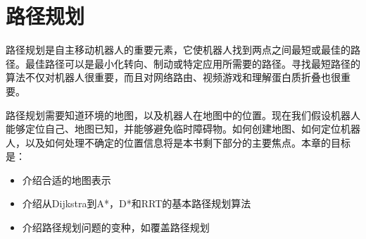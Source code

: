 \chapter{路径规划}
\label{chap:pathplanning}

路径规划是自主移动机器人的重要元素，它使机器人找到两点之间最短或最佳的路径。最佳路径可以是最小化转向、制动或特定应用所需要的路径。寻找最短路径的算法不仅对机器人很重要，而且对网络路由、视频游戏和理解蛋白质折叠也很重要。


路径规划需要知道环境的地图，以及机器人在地图中的位置。现在我们假设机器人能够定位自己、地图已知，并能够避免临时障碍物。如何创建地图、如何定位机器人，以及如何处理不确定的位置信息将是本书剩下部分的主要焦点。本章的目标是：

\begin{itemize}

\item 介绍合适的地图表示
\item 介绍从Dijkstra到A*，D*和RRT的基本路径规划算法
\item 介绍路径规划问题的变种，如覆盖路径规划
\end{itemize}

